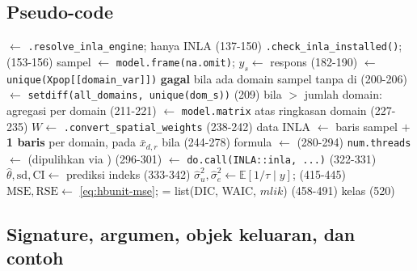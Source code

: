 \subsection{Pseudo-code}\label{sec:hbunit-algo}

\begin{algorithm}[htbp]
\caption{\texttt{hb\_unit} --- alur sebenarnya (\texttt{R/hb\_unit.R:123-548})}
\label{alg:hbunit}
 $\leftarrow$ \texttt{.resolve\_inla\_engine}; hanya INLA (137-150)\;
\texttt{.check\_inla\_installed()};\quad {} (153-156)\;
sampel $\leftarrow$ \texttt{model.frame(na.omit)}; $y_s\leftarrow$ respons (182-190)\;
 $\leftarrow$ \texttt{unique(Xpop[[domain\_var]])}\;
\textbf{gagal} bila ada domain sampel tanpa di  (200-206)\;
 $\leftarrow$ \texttt{setdiff(all\_domains, unique(dom\_s))} (209)\;
bila  $>$ jumlah domain: agregasi  per domain (211-221)\;
 $\leftarrow$ \texttt{model.matrix} atas ringkasan domain (227-235)\;
$W\leftarrow$ \texttt{.convert\_spatial\_weights} (238-242)\;
data INLA $\leftarrow$ baris sampel $+$ \textbf{1 baris } per domain, pada $\bar x_{d,r}$ bila  (244-278)\;
formula $\leftarrow$  (280-294)\;
\texttt{num.threads} $\leftarrow$  (dipulihkan via ) (296-301)\;
 $\leftarrow$ \texttt{do.call(INLA::inla, ...)} (322-331)\;
$\hat\theta,\mathrm{sd},\mathrm{CI}\leftarrow$ prediksi indeks  (333-342)\;
\;
$\hat\sigma_u^2,\hat\sigma_e^2\leftarrow\mathbb E[1/\tau\mid y]$;  (415-445)\;
$\mathrm{MSE},\mathrm{RSE}\leftarrow$ \eqref{eq:hbunit-mse};  = list(DIC, WAIC, $mlik$) (458-491)\;
kelas  (520)\;
\end{algorithm}

\subsection{Signature, argumen, objek keluaran, dan contoh}\label{sec:hbunit-api}

